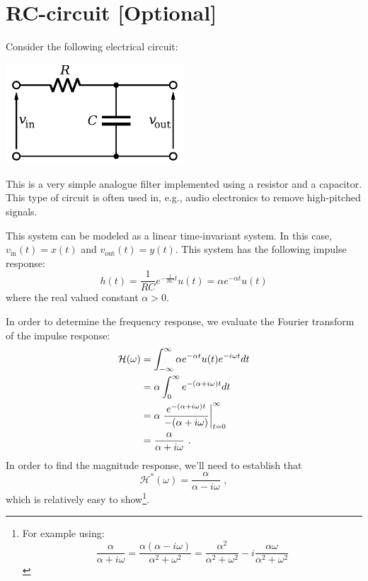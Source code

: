 \newpage
\section{RC-circuit [Optional]}
Consider the following electrical circuit:
\begin{center}
\includegraphics[width=0.5\textwidth]{Applications/figures/rc.pdf}
\end{center}
This is a very simple analogue filter implemented using a resistor and
a capacitor. This type of circuit is often used in, e.g., audio
electronics to remove high-pitched signals.

This system can be modeled as a linear time-invariant system. In this
case, $v_{\mathrm{in}}(t) = x(t)$ and $v_{\mathrm{out}}(t) =
y(t)$. This system has the following impulse response:
\begin{equation}
h(t) = \frac{1}{RC} e^{-\frac{1}{RC}t}u(t) = \alpha e^{-\alpha t} u(t)
\end{equation}
where the real valued constant $\alpha > 0$. 

In order to determine the frequency response, we evaluate the Fourier 
transform of the impulse response:
\begin{align}
\mathcal{H}(\omega) &= \int_{-\infty}^{\infty} \alpha e^{-\alpha t} u(t) e^{-i\omega t}dt \\
     &= \alpha \int_{0}^{\infty} e^{-(\alpha+i\omega) t} dt \\
     &= \alpha \left. \frac{e^{-(\alpha+i\omega)t}}{-(\alpha+i\omega)}\right\rvert_{t=0}^{\infty} \\
     &= \frac{\alpha}{\alpha + i\omega}\,\,.
\end{align}
In order to find the magnitude response, we'll need to establish that
\begin{equation}
  \mathcal{H}^*(\omega) = \frac{\alpha}{\alpha - i\omega}\,\,,
\end{equation}
which is relatively easy to show\footnote{For example using: \begin{equation*}\frac{\alpha}{\alpha + i \omega} = \frac{\alpha(\alpha - i\omega)}{\alpha^2 + \omega^2} = \frac{\alpha^2}{\alpha^2 + \omega^2} - i\frac{\alpha\omega}{\alpha^2 + \omega^2}\end{equation*}}.

